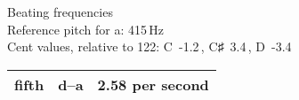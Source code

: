 \documentclass{standalone}
\def\str{\textquotesingle}
\def\cn{\textcent}
\begin{document}
\begin{minipage}{8cm}
\begin{center}
  {\Large Beating frequencies}\\[2ex]
  Reference pitch for a\str: 415\,Hz\\
  Cent values, relative to 122: C~-1.2\,\cn, C♯~3.4\,\cn, D~-3.4\,\cn
\end{center}

\begin{longtable}{p{1cm}p{1cm}p{3cm}}
  \toprule
  fifth & d\str--a\str & 2.58 per second \\
  \bottomrule
\end{longtable}
\end{minipage}
\end{document}
